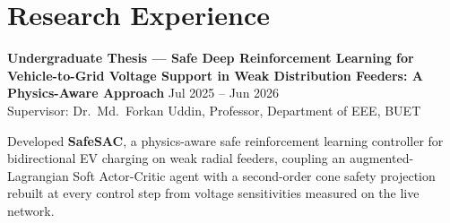 %
%
%

\section{Research Experience}

\textbf{Undergraduate Thesis --- Safe Deep Reinforcement Learning for Vehicle-to-Grid Voltage
Support in Weak Distribution Feeders: A Physics-Aware Approach} \hfill Jul 2025 -- Jun 2026\\
Supervisor: Dr.\ Md.\ Forkan Uddin, Professor, Department of EEE, BUET

Developed \textbf{SafeSAC}, a physics-aware safe reinforcement learning controller for
bidirectional EV charging on weak radial feeders, coupling an augmented-Lagrangian Soft
Actor-Critic agent with a second-order cone safety projection rebuilt at every control step from
voltage sensitivities measured on the live network.


